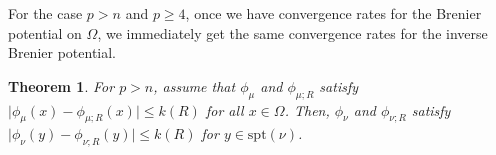 \documentclass{amsart}
\newtheorem{theorem}{Theorem}
\theoremstyle{lemma}
\theoremstyle{remark}
\begin{document}



For the case $p>n$ and $p \geq 4$, once we have convergence rates for the Brenier potential on $\Omega$, we immediately get the same convergence rates for the inverse Brenier potential.

\begin{theorem}\label{thm:pgn}
For $p>n$, assume that $\phi_{\mu}$ and $\phi_{\mu;R}$ satisfy $\vert \phi_{\mu}(x) - \phi_{\mu;R}(x) \vert \leq k(R)$ for all $x \in \Omega$. Then, $\phi_{\nu}$ and $\phi_{\nu;R}$ satisfy $\vert \phi_{\nu}(y) - \phi_{\nu;R}(y) \vert \leq k(R)$ for $y \in \text{spt}(\nu)$.
\end{theorem}
\end{document}
